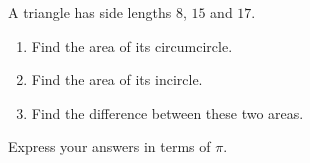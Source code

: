 A triangle has side lengths $8$, $15$ and $17$.
\begin{enumerate}
\item[(a)] Find the area of its circumcircle.
\item[(b)] Find the area of its incircle.
\item[(c)] Find the difference between these two areas.
\end{enumerate}
Express your answers in terms of $\pi$.
